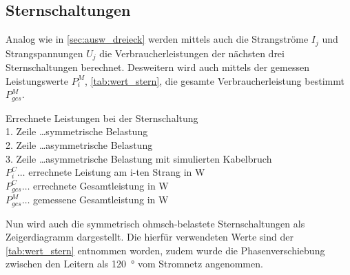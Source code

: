 \documentclass[12pt,english,ngerman]{scrartcl}
\begin{document}
\subsection{Sternschaltungen}\label{sec:aus_stern}

Analog wie in \autoref{sec:ausw_dreieck} werden mittels auch die Strangströme
$I_j$ und Strangspannungen $U_j$ die Verbraucherleistungen der nächsten drei
Sternschaltungen berechnet. Desweitern wird auch mittels der gemessen
Leistungswerte $P_i^M$, \autoref{tab:wert_stern}, die gesamte
Verbraucherleistung bestimmt $P_{ges}^{M}$.

\begin{table}[H]
	\caption[Errechnete Leistungen bei der Sternschaltung]{Errechnete Leistungen bei der
		Sternschaltung                                                    \\
		1. Zeile \dots symmetrische Belastung                             \\
		2. Zeile \dots asymmetrische Belastung                            \\
		3. Zeile \dots asymmetrische Belastung mit simulierten Kabelbruch \\
		$P_i^C \dots$ errechnete Leistung am i-ten Strang in W            \\
		$P_{ges}^C \dots$ errechnete Gesamtleistung in W                  \\
		$P_{ges}^M \dots$ gemessene Gesamtleistung in W
	}\label{tab:powerStern}
	\centering
	
\end{table}

Nun wird auch die symmetrisch ohmsch-belastete Sternschaltungen als
Zeigerdiagramm dargestellt. Die hierfür verwendeten Werte sind der
\autoref{tab:wert_stern} entnommen worden, zudem wurde die Phasenverschiebung
zwischen den Leitern als \SI{120}{\degree} vom Stromnetz angenommen.
\end{document}
